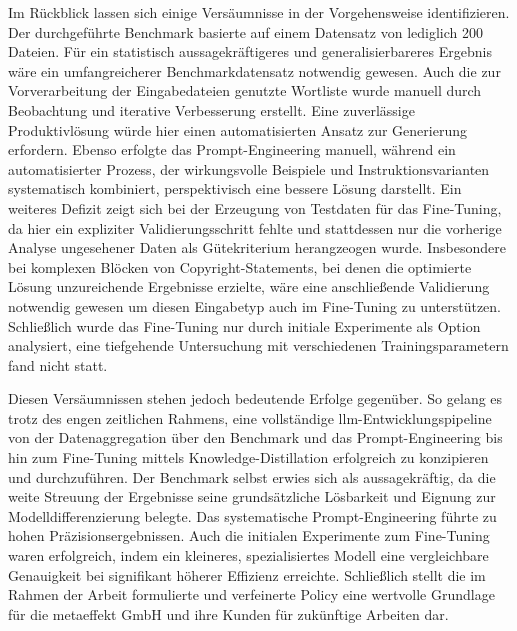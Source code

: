 Im Rückblick lassen sich einige Versäumnisse in der Vorgehensweise identifizieren.
Der durchgeführte Benchmark basierte auf einem Datensatz von lediglich \num{200} Dateien.
Für ein statistisch aussagekräftigeres und generalisierbareres Ergebnis wäre ein umfangreicherer Benchmarkdatensatz notwendig gewesen.
Auch die zur Vorverarbeitung der Eingabedateien genutzte Wortliste wurde manuell durch Beobachtung und iterative Verbesserung erstellt.
Eine zuverlässige Produktivlösung würde hier einen automatisierten Ansatz zur Generierung erfordern.
Ebenso erfolgte das Prompt-Engineering manuell, während ein automatisierter Prozess, der wirkungsvolle Beispiele und Instruktionsvarianten systematisch kombiniert, perspektivisch eine bessere Lösung darstellt.
Ein weiteres Defizit zeigt sich bei der Erzeugung von Testdaten für das Fine-Tuning, da hier ein expliziter Validierungsschritt fehlte und stattdessen nur die vorherige Analyse ungesehener Daten als Gütekriterium herangzeogen wurde.
Insbesondere bei komplexen Blöcken von Copyright-Statements, bei denen die optimierte Lösung unzureichende Ergebnisse erzielte, wäre eine anschließende Validierung notwendig gewesen um diesen Eingabetyp auch im Fine-Tuning zu unterstützen.
Schließlich wurde das Fine-Tuning nur durch initiale Experimente als Option analysiert, eine tiefgehende Untersuchung mit verschiedenen Trainingsparametern fand nicht statt.

Diesen Versäumnissen stehen jedoch bedeutende Erfolge gegenüber.
So gelang es trotz des engen zeitlichen Rahmens, eine vollständige \gls{llm}-Entwicklungspipeline von der Datenaggregation über den Benchmark und das Prompt-Engineering bis hin zum Fine-Tuning mittels Knowledge-Distillation erfolgreich zu konzipieren und durchzuführen.
Der Benchmark selbst erwies sich als aussagekräftig, da die weite Streuung der Ergebnisse seine grundsätzliche Lösbarkeit und Eignung zur Modelldifferenzierung belegte.
Das systematische Prompt-Engineering führte zu hohen Präzisionsergebnissen.
Auch die initialen Experimente zum Fine-Tuning waren erfolgreich, indem ein kleineres, spezialisiertes Modell eine vergleichbare Genauigkeit bei signifikant höherer Effizienz erreichte.
Schließlich stellt die im Rahmen der Arbeit formulierte und verfeinerte Policy eine wertvolle Grundlage für die metaeffekt GmbH und ihre Kunden für zukünftige Arbeiten dar.

